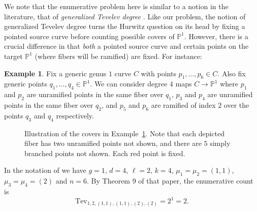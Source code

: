 \documentclass[thesis]{thesis-umich}           %
\renewcommand{\P}{\mathbb P}
\theoremstyle{definition}
\newtheorem{eg}[thm]{Example}
\begin{document}
We note that the enumerative problem here is similar to a notion in the literature,
that of {\it generalized Tevelev degree} \cite{Generalized}. Like our problem, the notion
of generalized Tevelev degree turns the Hurwitz question on its head by fixing
a pointed source curve before counting possible covers of $\P^1$. However, there is a crucial difference
in that {\it both} a pointed source curve and certain points on the target $\P^1$ (where fibers will be ramified) are fixed. For instance:

\begin{eg}
  \label{eg:tevelev}
  Fix a generic genus $1$ curve $C$ with points $p_1,\dots,p_6\in C$. Also fix generic points
  $q_1,\dots,q_4\in\P^1$. We can consider degree $4$ maps $C\to\P^1$ where $p_1$ and $p_2$ are unramified points in the same fiber over $q_1$, $p_3$ and $p_4$ are unramified points in the same fiber over $q_2$, and $p_5$ and $p_6$ are ramified of index $2$ over the points $q_3$ and $q_4$ respectively.

  \begin{figure}[h]
  \caption{Illustration of the covers in Example~\ref{eg:tevelev}. Note that each depicted fiber has two unramified points not shown, and there are $5$ simply branched points not shown. Each red point is fixed.}
  \centering
{}

\label{fig:tevelev}
\end{figure}

  In the notation of \cite{Generalized} we have $g=1$, $d=4$, $\ell=2$, $k=4$, $\mu_1=\mu_2=(1,1)$, $\mu_3=\mu_4=(2)$ and $n=6$. By Theorem 9 of that paper, the enumerative count is
  \[
  \text{Tev}_{1,2,(1,1),(1,1),(2),(2)}=2^1=2.
  \]
\end{eg}
\end{document}
